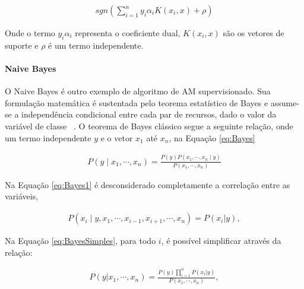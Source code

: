          \begin{equation}\label{eq:predSVM}
          \begin{aligned}
            sgn(\sum_{i=1}^{n}y_{i}\alpha_{i}K(x_{i},x)+\rho )
        \end{aligned}
        \end{equation}
        
        Onde o termo $y_{i}\alpha_{i}$ representa o coeficiente dual, $K(x_{i},x)$ são os vetores de suporte e $\rho$ é um termo independente.



        \paragraph{Naive Bayes}

        O Naive Bayes é outro exemplo de algoritmo de \acrshort{AM} supervisionado. Sua formulação matemática é sustentada pelo teorema estatístico de Bayes e assume-se a independência condicional entre cada par de recursos, dado o valor da variável de classe ~\cite{McCallum98acomparison}. O teorema de Bayes clássico segue a seguinte relação, onde um termo independente $y$ e o vetor $x_{1}$ até $x_{n}$, na Equação
        \ref{eq:Bayes}

        \begin{equation}\label{eq:Bayes}
          \begin{aligned}
            P\left ( y\mid x_{1},\cdots, x_{n} \right ) = \frac{P(y)P(x_{1},\cdots,x_{n}\mid y)}{P(x_{1},\cdots, x_{n})}
        \end{aligned}
        \end{equation}
        

        Na Equação \ref{eq:Bayes1} é desconsiderado completamente a correlação entre as variáveis, 


        \begin{equation}\label{eq:Bayes1}
          \begin{aligned}
            P\left ( x_{i}\mid y,x_{1}, \cdots,x_{i-1},x_{i+1},\cdots, x_{n} \right ) = P(x_{i}|y),
        \end{aligned}
        \end{equation}


        Na Equação \ref{eq:BayesSimples}, para todo $i$, é possível simplificar através da relação:


        \begin{equation}\label{eq:BayesSimples}
          \begin{aligned}
            P(y|x_{1},\cdots, x_{n}) = \frac{P(y)\prod_{i=1}^{n}P(x_{i}|y)}{P(x_{1},\cdots, x_{n})},
        \end{aligned}
        \end{equation}


